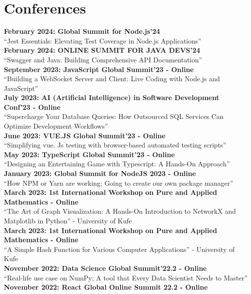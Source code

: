 \documentclass[a4paper,10pt]{article}
\begin{document}
\section{\textbf{Conferences}}
\textbf{February 2024: Global Summit for Node.js'24}\\
“Jest Essentials: Elevating Test Coverage in Node.js Applications”\\
\textbf{February 2024: ONLINE SUMMIT FOR JAVA DEVS'24}\\
“Swagger and Java: Building Comprehensive API Documentation”\\
\textbf{September 2023: JavaScript Global Summit’23 - Online}\\
“Building a WebSocket Server and Client: Live Coding with Node.js and JavaScript”\\
\textbf{July 2023: AI (Artificial Intelligence) in Software Development Conf’23 - Online}\\
“Supercharge Your Database Queries: How Outsourced SQL Services Can Optimize Development Workflows”\\
\textbf{June 2023: VUE.JS Global Summit’23 - Online}\\
“Simplifying vue. Js testing with browser-based automated testing scripts”\\
\textbf{May 2023: TypeScript Global Summit’23 - Online}\\
“Designing an Entertaining Game with Typescript: A Hands-On Approach”\\
\textbf{January 2023: Global Summit for NodeJS 2023 - Online}\\
“How NPM or Yarn are working; Going to create our own package manager”\\
\textbf{March 2023: 1st International Workshop on Pure and Applied Mathematics - Online}\\
“The Art of Graph Visualization: A Hands-On Introduction to NetworkX and Matplotlib in Python” - University of Kufe\\
\textbf{March 2023: 1st International Workshop on Pure and Applied Mathematics - Online}\\
“A Simple Hash Function for Various Computer Applications” - University of Kufe\\
\textbf{November 2022: Data Science Global Summit’22.2 - Online}\\
“Real-life use case on NumPy; A tool that Every Data Scientist Needs to Master”\\
\textbf{November 2022: React Global Online Summit 22.2 - Online}\\
\end{document}
